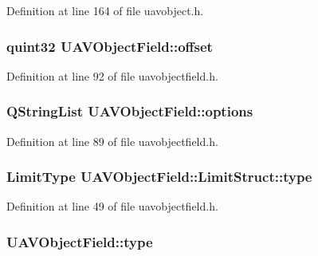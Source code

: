 Definition at line 164 of file uavobject.\-h.

\hypertarget{group___u_a_v_objects_plugin_ga8d473734be71fe3a3dbcd1a854b497f2}{
\subsubsection[{offset}]{\setlength{\rightskip}{0pt plus 5cm}quint32 U\-A\-V\-Object\-Field\-::offset\hspace{0.3cm}{\ttfamily [protected]}}}\label{group___u_a_v_objects_plugin_ga8d473734be71fe3a3dbcd1a854b497f2}


Definition at line 92 of file uavobjectfield.\-h.

\hypertarget{group___u_a_v_objects_plugin_ga97fe1c3ed2d74eb06ea7e24abf4ce09c}{
\subsubsection[{options}]{\setlength{\rightskip}{0pt plus 5cm}Q\-String\-List U\-A\-V\-Object\-Field\-::options\hspace{0.3cm}{\ttfamily [protected]}}}\label{group___u_a_v_objects_plugin_ga97fe1c3ed2d74eb06ea7e24abf4ce09c}


Definition at line 89 of file uavobjectfield.\-h.

\hypertarget{group___u_a_v_objects_plugin_ga7f346cc2754bc63a0a0ae587b183b3ff}{
\subsubsection[{type}]{\setlength{\rightskip}{0pt plus 5cm}Limit\-Type U\-A\-V\-Object\-Field\-::\-Limit\-Struct\-::type}}\label{group___u_a_v_objects_plugin_ga7f346cc2754bc63a0a0ae587b183b3ff}


Definition at line 49 of file uavobjectfield.\-h.

\hypertarget{group___u_a_v_objects_plugin_gad84e6c3a333d2c62b5159936e42fb737}{
\subsubsection[{type}]{ U\-A\-V\-Object\-Field\-::type\hspace{0.3cm}{\ttfamily [protected]}}}\label{group___u_a_v_objects_plugin_gad84e6c3a333d2c62b5159936e42fb737}


